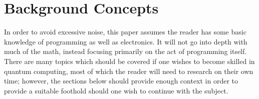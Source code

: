 \documentclass[a4paper]{article}
\begin{document}
\section{Background Concepts}
\label{sec:backgroundconcepts}
In order to avoid excessive noise, this paper assumes the reader has some basic knowledge of programming as well as electronics.  It will not go into depth with much of the math, instead focusing primarily on the act of programming itself.  There are many topics which should be covered if one wishes to become skilled in quantum computing, most of which the reader will need to research on their own time; however, the sections below should provide enough context in order to provide a suitable foothold should one wish to continue with the subject.
\end{document}

